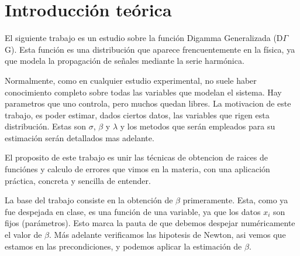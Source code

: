 \section{Introducci\'on te\'orica}

El siguiente trabajo es un estudio sobre la funci\'on Digamma Generalizada (D$\Gamma$G). Esta funci\'on es una
distribuci\'on que aparece frencuentemente en la f\'isica, ya que modela la propagaci\'on de se\~nales mediante la
serie harm\'onica.

Normalmente, como en cualquier estudio experimental, no suele haber conocimiento completo sobre todas las variables
que modelan el sistema. Hay parametros que uno controla, pero muchos quedan libres. La motivacion de este trabajo,
es poder estimar, dados ciertos datos, las variables que rigen esta distribuci\'on. Estas son $\sigma$, $\beta$ y $\lambda$
y los metodos que ser\'an empleados para su estimaci\'on ser\'an detallados mas adelante.

El proposito de este trabajo es unir las t\'ecnicas de obtencion de raices de funci\'ones y calculo de errores
que vimos en la materia, con una aplicaci\'on pr\'actica, concreta y sencilla de entender.

La base del trabajo consiste en la obtenci\'on de $\beta$ primeramente. Esta, como ya fue despejada en clase, es una funci\'on
de una variable, ya que los datos $x_i$ son fijos (par\'ametros). Esto marca la pauta de que debemos despejar num\'ericamente el
valor de $\beta$. M\'as adelante verificamos las hipotesis de Newton, asi vemos que estamos en las precondiciones,
y podemos aplicar la estimaci\'on de $\beta$.
